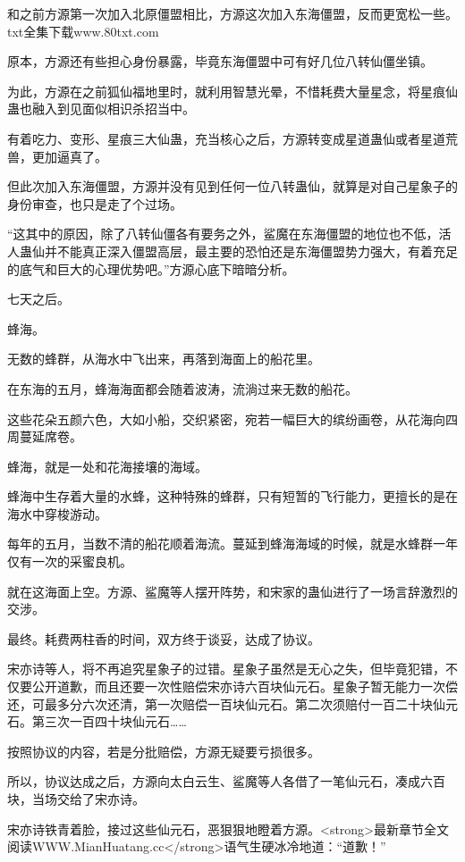 
\begin{this_body}

和之前方源第一次加入北原僵盟相比，方源这次加入东海僵盟，反而更宽松一些。txt全集下载www.80txt.com

原本，方源还有些担心身份暴露，毕竟东海僵盟中可有好几位八转仙僵坐镇。

为此，方源在之前狐仙福地里时，就利用智慧光晕，不惜耗费大量星念，将星痕仙蛊也融入到见面似相识杀招当中。

有着吃力、变形、星痕三大仙蛊，充当核心之后，方源转变成星道蛊仙或者星道荒兽，更加逼真了。

但此次加入东海僵盟，方源并没有见到任何一位八转蛊仙，就算是对自己星象子的身份审查，也只是走了个过场。

“这其中的原因，除了八转仙僵各有要务之外，鲨魔在东海僵盟的地位也不低，活人蛊仙并不能真正深入僵盟高层，最主要的恐怕还是东海僵盟势力强大，有着充足的底气和巨大的心理优势吧。”方源心底下暗暗分析。

七天之后。

蜂海。

无数的蜂群，从海水中飞出来，再落到海面上的船花里。

在东海的五月，蜂海海面都会随着波涛，流淌过来无数的船花。

这些花朵五颜六色，大如小船，交织紧密，宛若一幅巨大的缤纷画卷，从花海向四周蔓延席卷。

蜂海，就是一处和花海接壤的海域。

蜂海中生存着大量的水蜂，这种特殊的蜂群，只有短暂的飞行能力，更擅长的是在海水中穿梭游动。

每年的五月，当数不清的船花顺着海流。蔓延到蜂海海域的时候，就是水蜂群一年仅有一次的采蜜良机。

就在这海面上空。方源、鲨魔等人摆开阵势，和宋家的蛊仙进行了一场言辞激烈的交涉。

最终。耗费两柱香的时间，双方终于谈妥，达成了协议。

宋亦诗等人，将不再追究星象子的过错。星象子虽然是无心之失，但毕竟犯错，不仅要公开道歉，而且还要一次性赔偿宋亦诗六百块仙元石。星象子暂无能力一次偿还，可最多分六次还清，第一次赔偿一百块仙元石。第二次须赔付一百二十块仙元石。第三次一百四十块仙元石……

按照协议的内容，若是分批赔偿，方源无疑要亏损很多。

所以，协议达成之后，方源向太白云生、鲨魔等人各借了一笔仙元石，凑成六百块，当场交给了宋亦诗。

宋亦诗铁青着脸，接过这些仙元石，恶狠狠地瞪着方源。<strong>最新章节全文阅读WWW.MianHuatang.cc</strong>语气生硬冰冷地道：“道歉！”


\end{this_body}
